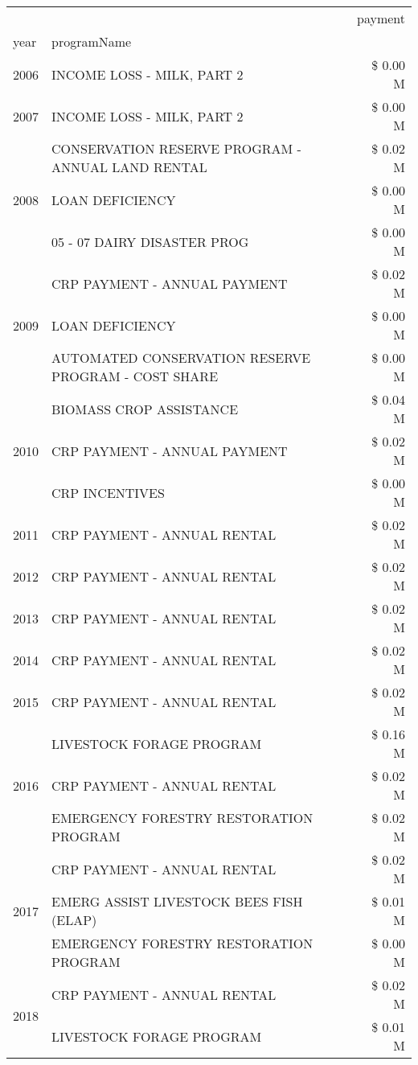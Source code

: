 \begin{tabular}{llr}
\toprule
 &  & payment \\
year & programName &  \\
\midrule
2006 & INCOME LOSS - MILK, PART 2 & \$ 0.00 M \\
\cline{1-3}
2007 & INCOME LOSS - MILK, PART 2 & \$ 0.00 M \\
\cline{1-3}
\multirow[t]{3}{*}{2008} & CONSERVATION RESERVE PROGRAM - ANNUAL LAND RENTAL & \$ 0.02 M \\
 & LOAN DEFICIENCY & \$ 0.00 M \\
 & 05 - 07 DAIRY DISASTER PROG & \$ 0.00 M \\
\cline{1-3}
\multirow[t]{3}{*}{2009} & CRP PAYMENT - ANNUAL PAYMENT & \$ 0.02 M \\
 & LOAN DEFICIENCY & \$ 0.00 M \\
 & AUTOMATED CONSERVATION RESERVE PROGRAM - COST SHARE & \$ 0.00 M \\
\cline{1-3}
\multirow[t]{3}{*}{2010} & BIOMASS CROP ASSISTANCE & \$ 0.04 M \\
 & CRP PAYMENT - ANNUAL PAYMENT & \$ 0.02 M \\
 & CRP INCENTIVES & \$ 0.00 M \\
\cline{1-3}
2011 & CRP PAYMENT - ANNUAL RENTAL & \$ 0.02 M \\
\cline{1-3}
2012 & CRP PAYMENT - ANNUAL RENTAL & \$ 0.02 M \\
\cline{1-3}
2013 & CRP PAYMENT - ANNUAL RENTAL & \$ 0.02 M \\
\cline{1-3}
2014 & CRP PAYMENT - ANNUAL RENTAL & \$ 0.02 M \\
\cline{1-3}
2015 & CRP PAYMENT - ANNUAL RENTAL & \$ 0.02 M \\
\cline{1-3}
\multirow[t]{3}{*}{2016} & LIVESTOCK FORAGE PROGRAM & \$ 0.16 M \\
 & CRP PAYMENT - ANNUAL RENTAL & \$ 0.02 M \\
 & EMERGENCY FORESTRY RESTORATION PROGRAM & \$ 0.02 M \\
\cline{1-3}
\multirow[t]{3}{*}{2017} & CRP PAYMENT - ANNUAL RENTAL & \$ 0.02 M \\
 & EMERG ASSIST LIVESTOCK BEES FISH (ELAP) & \$ 0.01 M \\
 & EMERGENCY FORESTRY RESTORATION PROGRAM & \$ 0.00 M \\
\cline{1-3}
\multirow[t]{3}{*}{2018} & CRP PAYMENT - ANNUAL RENTAL & \$ 0.02 M \\
 & LIVESTOCK FORAGE PROGRAM & \$ 0.01 M \\

\end{tabular}
